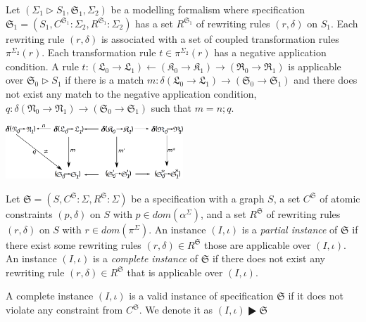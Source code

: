 \documentclass{eceasst}
\begin{document}
\begin{definition}
 Let $(\Sigma_1 \rhd S_1, \mathfrak{S}_1, \Sigma_2)$ be a modelling formalism where specification $\mathfrak{S}_1 = (S_1, C^{\mathfrak{S}_1}:\Sigma_2, R^{\mathfrak{S}_1}:\Sigma_2)$ 
 has a set $R^{\mathfrak{S}_1}$ of rewriting rules $(r, \delta)$ on $S_1$.
 Each rewriting rule $(r, \delta)$ is associated with a set of coupled transformation rules $\pi^{\Sigma_2}(r)$. 
Each transformation rule $t \in \pi^{\Sigma_2}(r)$ has a negative application condition. 
A rule $t: (\mathfrak{L}_0 \rightarrow \mathfrak{L}_1) \leftarrow (\mathfrak{K}_0 \rightarrow \mathfrak{K}_1) \rightarrow  (\mathfrak{R}_0 \rightarrow \mathfrak{R}_1)$ 
is applicable over $\mathfrak{S}_0 \rhd S_1$ 
if there is a match $m : \delta( \mathfrak{L}_0 \rightarrow \mathfrak{L}_1) \rightarrow (\mathfrak{S}_0 \rightarrow \mathfrak{S}_1)$ 
and there does not exist any match to the negative application condition, $q : \delta( \mathfrak{N}_0 \rightarrow \mathfrak{N}_1) \rightarrow (\mathfrak{S}_0 \rightarrow \mathfrak{S}_1)$ 
such that $m = n ; q$. 

\begin{center}
\includegraphics[width=0.5\textwidth]{dpo.pdf}
\end{center}
\end{definition}


\begin{definition}
 Let $\mathfrak{S} = (S, C^{\mathfrak{S}}:\Sigma, R^{\mathfrak{S}}:\Sigma )$ be a specification with 
 a graph $S$, 
 a set $C^\mathfrak{S}$ of atomic constraints $(p, \delta)$ on $S$ with $p \in dom(\alpha^\Sigma)$, and
 a set $R^\mathfrak{S}$ of rewriting rules $(r, \delta)$ on $S$ with $r \in dom(\pi^\Sigma)$. 
 An instance $(I, \iota)$ is a \textit{partial instance} of $\mathfrak{S}$ if there exist some rewriting rules $(r, \delta) \in R^{\mathfrak{S}}$ those are applicable over $(I, \iota)$. 
 An instance $(I, \iota)$ is a \textit{complete instance} of $\mathfrak{S}$ if there does not exist any rewriting rule $(r, \delta) \in R^{\mathfrak{S}}$ that is applicable over $(I, \iota)$. 

\end{definition}


\begin{remark}
A complete instance $(I, \iota)$ is a valid instance of specification $\mathfrak{S}$ if it does not violate any constraint from $C^{\mathfrak{S}}$. We denote it as $(I, \iota) \RHD \mathfrak{S}$
\end{remark}
\end{document}
